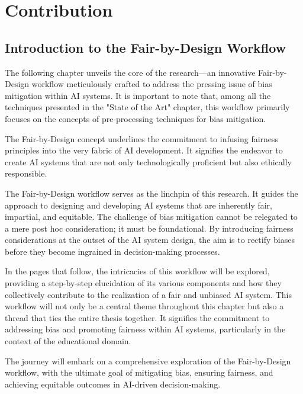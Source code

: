 \documentclass[12pt,a4paper,openright,twoside]{book}
\begin{document}
\chapter{Contribution} %
\label{chap:contribution}
\section{Introduction to the Fair-by-Design Workflow}
The following chapter unveils the core of the research—an innovative Fair-by-Design workflow meticulously crafted to address the pressing issue of bias mitigation within AI systems. It is important to note that, among all the techniques presented in the "State of the Art" chapter, this workflow primarily focuses on the concepts of pre-processing techniques for bias mitigation. 

The Fair-by-Design concept underlines the commitment to infusing fairness principles into the very fabric of AI development. It signifies the endeavor to create AI systems that are not only technologically proficient but also ethically responsible. 

The Fair-by-Design workflow serves as the linchpin of this research. It guides the approach to designing and developing AI systems that are inherently fair, impartial, and equitable. The challenge of bias mitigation cannot be relegated to a mere post hoc consideration; it must be foundational. By introducing fairness considerations at the outset of the AI system design, the aim is to rectify biases before they become ingrained in decision-making processes. 

In the pages that follow, the intricacies of this workflow will be explored, providing a step-by-step elucidation of its various components and how they collectively contribute to the realization of a fair and unbiased AI system. This workflow will not only be a central theme throughout this chapter but also a thread that ties the entire thesis together. It signifies the commitment to addressing bias and promoting fairness within AI systems, particularly in the context of the educational domain. 

The journey will embark on a comprehensive exploration of the Fair-by-Design workflow, with the ultimate goal of mitigating bias, ensuring fairness, and achieving equitable outcomes in AI-driven decision-making.
\end{document}
